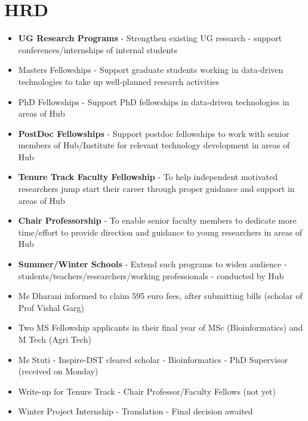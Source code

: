 \section{\textbf{HRD}}

\begin{frame}[fragile=singleslide]{}
\begin{center}
\begin {itemize}
\item {\textbf{UG Research Programs}} - Strengthen existing UG research - support conferences/internships of internal students
\item {Masters Fellowships} - Support graduate students working in data-driven technologies to take up well-planned research activities
\item {PhD Fellowships} - Support PhD fellowships in data-driven technologies in areas of Hub
\item {\textbf{PostDoc Fellowships}} - Support postdoc fellowships to work with senior members of Hub/Institute for relevant technology development in areas of Hub
\item {\textbf{Tenure Track Faculty Fellowship}} - To help independent motivated researchers jump start their career through proper guidance and support in areas of Hub
\item {\textbf{Chair Professorship}} - To enable senior faculty members to dedicate more time/effort to provide direction and guidance to  young researchers in areas of Hub
\item {\textbf{Summer/Winter Schools}} - Extend such programs to widen audience - students/teachers/researchers/working professionals - conducted by Hub
\end{itemize}
\end{center}
\end{frame}



\begin{frame}[fragile=singleslide]{}
\begin{center}
\begin {itemize}
\item Ms Dharani informed to claim 595 euro fees, after submitting bills (scholar of Prof Vishal Garg)
\item Two MS Fellowship applicants in their final year of MSc (Bioinformatics) and M Tech (Agri Tech)
\item Ms Stuti - Inspire-DST cleared scholar - Bioinformatics - PhD Supervisor  (received on Monday)
\item Write-up for Tenure Track - Chair Professor/Faculty Fellows (not yet)
\item Winter Project Internship  - Translation - Final decision awaited
\end{itemize}
\end{center}
\end{frame}

